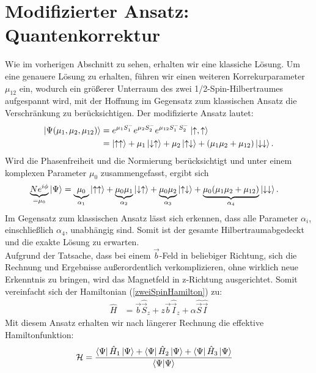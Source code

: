 



\section{Modifizierter Ansatz: Quantenkorrektur}
\noindent Wie im vorherigen Abschnitt zu sehen, erhalten wir eine klassiche Lösung. Um eine genauere Lösung zu erhalten, 
führen wir einen weiteren Korrekurparameter $\mu_{12}$ ein, wodurch ein größerer Unterraum des zwei 1/2-Spin-Hilbertraumes aufgespannt 
wird, mit der Hoffnung im Gegensatz zum klassischen Ansatz die Verschränkung zu berücksichtigen. Der modifizierte Ansatz lautet:
\begin{align}
    \ket{\Psi(\mu_1,\mu_2,\mu_{12})} &= e^{\mu_1 S_1^-}e^{\mu_2 S_2^-}e^{\mu_{12} S_1^-S_2^-}\ket{\uparrow,\uparrow}\\
                                    &= \ket{\uparrow \uparrow} +\mu_1\ket{\downarrow \uparrow} + \mu_2\ket{\uparrow \downarrow} + (\mu_1\mu_2 + \mu_{12})\ket{\downarrow \downarrow}.
\end{align}
Wird  die Phasenfreiheit und die Normierung berücksichtigt und unter einem komplexen Parameter $\mu_0$ zusammengefasst, ergibt sich
\begin{align}
    \underbrace{Ne^{i\phi}}_{=\mu_0}\ket{\Psi} &= \underbrace{\mu_0}_{\alpha_1}\ket{\uparrow \uparrow} 
    + \underbrace{\mu_0\mu_1}_{\alpha_2}\ket{\downarrow \uparrow} + \underbrace{\mu_0\mu_2}_{\alpha_3}\ket{\uparrow \downarrow} 
    + \underbrace{\mu_0(\mu_1\mu_2 + \mu_{12})}_{\alpha_4}\ket{\downarrow\downarrow}.
\end{align}
Im Gegensatz zum klassischen Ansatz lässt sich erkennen, dass alle Parameter $\alpha_i$, einschließlich $\alpha_4$, unabhängig sind. Somit ist der gesamte
Hilbertraumabgedeckt und die exakte Lösung zu erwarten.\\
Aufgrund der Tatsache, dass bei einem $\vec{b}$-Feld in beliebiger Richtung, sich die Rechnung und Ergebnisse außerordentlich verkomplizieren, ohne 
wirklich neue Erkenntnis zu bringen, wird das Magnetfeld in z-Richtung ausgerichtet. Somit vereinfacht sich der 
Hamiltonian (\ref{zweiSpinHamilton}) zu:
\begin{align}\label{Hamiltonian_Bz}
    \hat{H} &= \vec{b}\hat{\vec{S}}_z +  z\vec{b}\hat{\vec{I}}_z + \alpha \hat{\vec{S}}\hat{\vec{I}}
\end{align}
Mit diesem Ansatz erhalten wir nach längerer Rechnung die effektive Hamiltonfunktion:
\begin{align}
    \mathcal{H} &= \frac{\bra{\Psi}\hat{H}_1\ket{\Psi} +\bra{\Psi}\hat{H}_2\ket{\Psi} + \bra{\Psi}\hat{H}_3\ket{\Psi}}{\bra{\Psi}\ket{\Psi}}
\end{align}

